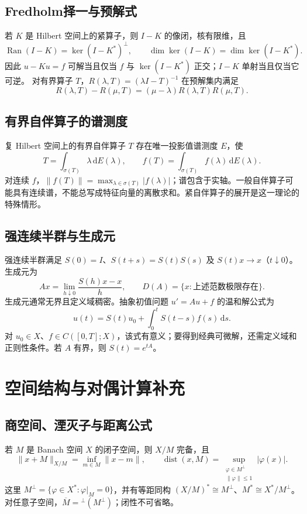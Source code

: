 \documentclass[../main.tex]{subfiles}
\begin{document}
\subsection{Fredholm择一与预解式}
若 $K$ 是 Hilbert 空间上的紧算子，则 $I-K$ 的像闭，核有限维，且
\[
\operatorname{Ran}(I-K)=\ker(I-K^*)^\perp,
\qquad\dim\ker(I-K)=\dim\ker(I-K^*).
\]
因此 $u-Ku=f$ 可解当且仅当 $f$ 与 $\ker(I-K^*)$ 正交；$I-K$ 单射当且仅当它可逆。
对有界算子 $T$，$R(\lambda,T)=(\lambda I-T)^{-1}$ 在预解集内满足
\[
R(\lambda,T)-R(\mu,T)=(\mu-\lambda)R(\lambda,T)R(\mu,T).
\]
\subsection{有界自伴算子的谱测度}
复 Hilbert 空间上的有界自伴算子 $T$ 存在唯一投影值谱测度 $E$，使
\[
T=\int_{\sigma(T)}\lambda\,\mathrm dE(\lambda),\qquad
f(T)=\int_{\sigma(T)}f(\lambda)\,\mathrm dE(\lambda).
\]
对连续 $f$，$\|f(T)\|=\max_{\lambda\in\sigma(T)}|f(\lambda)|$；谱包含于实轴。一般自伴算子可能具有连续谱，不能总写成特征向量的离散求和。紧自伴算子的展开是这一理论的特殊情形。
\subsection{强连续半群与生成元}
强连续半群满足 $S(0)=I$、$S(t+s)=S(t)S(s)$ 及 $S(t)x\to x$（$t\downarrow0$）。生成元为
\[
Ax=\lim_{h\downarrow0}\frac{S(h)x-x}{h},\qquad
D(A)=\{x:\text{上述范数极限存在}\}.
\]
生成元通常无界且定义域稠密。抽象初值问题 $u'=Au+f$ 的温和解公式为
\[
u(t)=S(t)u_0+\int_0^tS(t-s)f(s)\,\mathrm ds.
\]
对 $u_0\in X$、$f\in C([0,T];X)$，该式有意义；要得到经典可微解，还需定义域和正则性条件。若 $A$ 有界，则 $S(t)=e^{tA}$。
\section{空间结构与对偶计算补充}
\subsection{商空间、湮灭子与距离公式}
若 $M$ 是 Banach 空间 $X$ 的闭子空间，则 $X/M$ 完备，且
\[
\|x+M\|_{X/M}=\inf_{m\in M}\|x-m\|,\qquad
\operatorname{dist}(x,M)=\sup_{\substack{\varphi\in M^\perp\\\|\varphi\|\le1}}|\varphi(x)|.
\]
这里 $M^\perp=\{\varphi\in X^*: \varphi|_M=0\}$，并有等距同构 $(X/M)^*\cong M^\perp$、$M^*\cong X^*/M^\perp$。对任意子空间，$\overline M={}^{\perp}(M^\perp)$；闭性不可省略。
\end{document}
